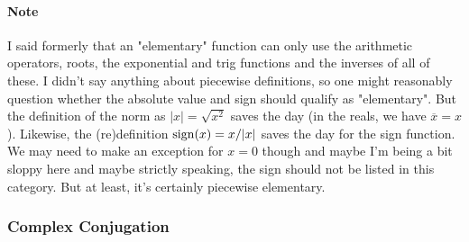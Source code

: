 \paragraph{Note}
I said formerly that an "elementary" function can only use the arithmetic operators, roots, the exponential and trig functions and the inverses of all of these. I didn't say anything about piecewise definitions, so one might reasonably question whether the absolute value and sign should qualify as "elementary". But the definition of the norm as $|x| = \sqrt{x^2}$ saves the day (in the reals, we have $\overline{x} = x$). Likewise, the (re)definition $\operatorname{sign}(x) = x / |x|$ saves the day for the sign function. We may need to make an exception for $x = 0$ though and maybe I'm being a bit sloppy here and maybe strictly speaking, the sign should not be listed in this category. But at least, it's certainly piecewise elementary.


\subsubsection{Complex Conjugation}



